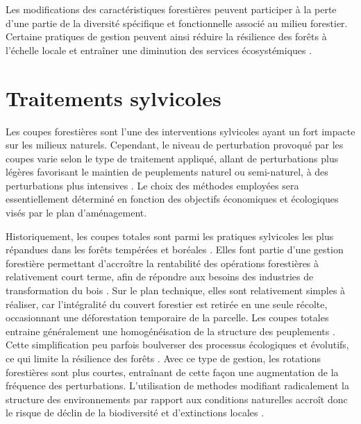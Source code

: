 Les modifications des caractéristiques forestières peuvent participer à la perte d'une partie de la diversité spécifique et fonctionnelle associé au milieu forestier. 
Certaine pratiques de gestion peuvent ainsi réduire la résilience des forêts à l'échelle locale et entraîner une diminution des services écosystémiques \citep{Hooper2012globalsynthesis,Edwards2014Maintainingecosystem}. 


\section*{Traitements sylvicoles}
\label{sec:sylvicole}

Les coupes forestières sont l'une des interventions sylvicoles ayant un fort impacte sur les milieux naturels. 
Cependant, le niveau de perturbation provoqué par les coupes varie selon le type de traitement appliqué, allant de perturbations plus légères favorisant le maintien de peuplements naturel ou semi-naturel, à des perturbations plus intensives \citep{Ameray2021Forestcarbon}. 
Le choix des méthodes employées sera essentiellement déterminé en fonction des objectifs économiques et écologiques visés par le plan d'aménagement.

Historiquement, les coupes totales sont parmi les pratiques sylvicoles les plus répandues dans les forêts tempérées et boréales \citep{Fedrowitz2014Canretention,Chaudhary2016Impactforest}. 
Elles font partie d’une gestion forestière permettant d’accroître la rentabilité des opérations forestières à relativement court terme, afin de répondre aux besoins des industries de transformation du bois \citep{Irland2011TimberProductivitya}. 
Sur le plan technique, elles sont relativement simples à réaliser, car l'intégralité du couvert forestier est retirée en une seule récolte, occasionnant une déforestation temporaire de la parcelle. 
Les coupes totales entraine généralement une homogénéisation de la structure des peuplements \citep{Brashears2004AssessmentCanopy,Martin2020Forestmanagement}. 
Cette simplification peu parfois boulverser des processus écologiques et évolutifs, ce qui limite la résilience des forêts \citep{Holling2001UnderstandingComplexity}. 
Avec ce type de gestion, les rotations forestières sont plus courtes, entraînant de cette façon une augmentation de la fréquence des perturbations. 
L’utilisation de methodes modifiant radicalement la structure des environnements par rapport aux conditions naturelles accroît donc le risque de déclin de la biodiversité et d’extinctions locales \citep{Hanski2000Extinctiondebt}. 

